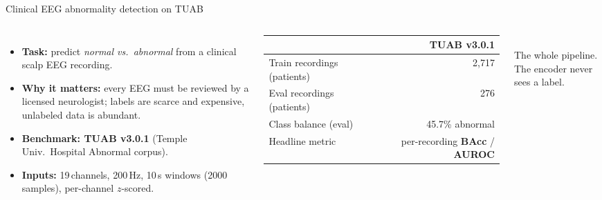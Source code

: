 \documentclass[aspectratio=169,11pt]{beamer}
\newcommand{\sectionheader}[1]{\renewcommand{\insertsection}{#1}}
\begin{document}
\sectionheader{OVERVIEW \,\textperiodcentered\, THE TASK}
\begin{frame}{Clinical EEG abnormality detection on TUAB}
\begin{columns}[T,onlytextwidth]
\begin{itemize}\setlength\itemsep{0pt}
  \item \textbf{Task:} predict \emph{normal vs.\ abnormal} from a clinical scalp EEG recording.
  \item \textbf{Why it matters:} every EEG must be reviewed by a licensed neurologist;
        labels are scarce and expensive, unlabeled data is abundant.
  \item \textbf{Benchmark: TUAB v3.0.1} (Temple Univ.\ Hospital Abnormal corpus).
  \item \textbf{Inputs:} 19\,channels, 200\,Hz, 10\,s windows (2000 samples), per-channel $z$-scored.
\end{itemize}

\vspace{0.4em}
\centering\small
\begin{tabular}{@{}lr@{}}
\toprule
& \textbf{TUAB v3.0.1} \\
\midrule
Train recordings (patients) & 2{,}717 \\
Eval  recordings (patients) & 276 \\
Class balance (eval)        & 45.7\% abnormal \\
Headline metric             & per-recording \textbf{BAcc} / \textbf{AUROC} \\
\bottomrule
\end{tabular}

\centering
{}\\[0.3em]
{\scriptsize\textcolor{tplsec}{The whole pipeline. The encoder never sees a label.}}
\end{columns}
\end{frame}
\end{document}
